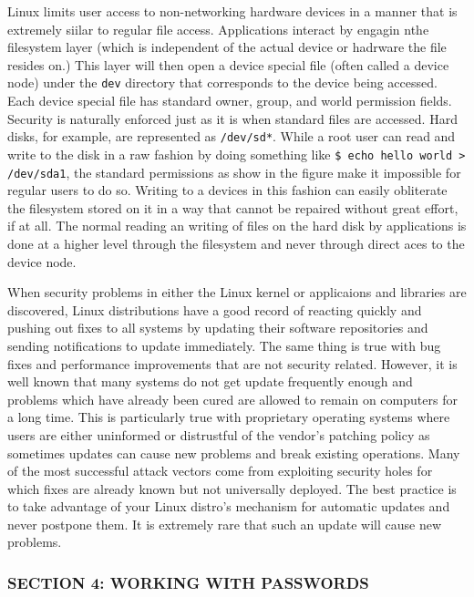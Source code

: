 Linux limits user access to non-networking hardware devices in a manner
that is extremely siilar to regular file access. Applications interact
by engagin nthe filesystem layer (which is independent of the actual
device or hadrware the file resides on.) This layer will then open a
device special file (often called a device node) under the \texttt{dev}
directory that corresponds to the device being accessed. Each device
special file has standard owner, group, and world permission fields.
Security is naturally enforced just as it is when standard files are
accessed. Hard disks, for example, are represented as \texttt{/dev/sd*}.
While a root user can read and write to the disk in a raw fashion by
doing something like
\texttt{\$ echo hello world \textgreater{} /dev/sda1}, the standard
permissions as show in the figure make it impossible for regular users
to do so. Writing to a devices in this fashion can easily obliterate the
filesystem stored on it in a way that cannot be repaired without great
effort, if at all. The normal reading an writing of files on the hard
disk by applications is done at a higher level through the filesystem
and never through direct aces to the device node.

When security problems in either the Linux kernel or applicaions and
libraries are discovered, Linux distributions have a good record of
reacting quickly and pushing out fixes to all systems by updating their
software repositories and sending notifications to update immediately.
The same thing is true with bug fixes and performance improvements that
are not security related. However, it is well known that many systems do
not get update frequently enough and problems which have already been
cured are allowed to remain on computers for a long time. This is
particularly true with proprietary operating systems where users are
either uninformed or distrustful of the vendor's patching policy as
sometimes updates can cause new problems and break existing operations.
Many of the most successful attack vectors come from exploiting security
holes for which fixes are already known but not universally deployed.
The best practice is to take advantage of your Linux distro's mechanism
for automatic updates and never postpone them. It is extremely rare that
such an update will cause new problems.

\subsubsection{SECTION 4: WORKING WITH
PASSWORDS}\label{section-4-working-with-passwords}

